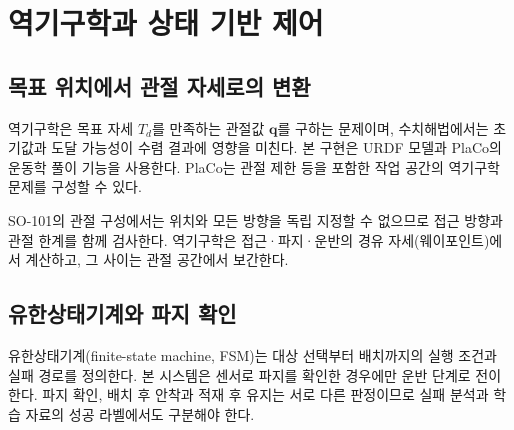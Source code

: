 \section{역기구학과 상태 기반 제어}
\subsection{목표 위치에서 관절 자세로의 변환}
역기구학은 목표 자세 $T_d$를 만족하는 관절값 $\boldsymbol{q}$를 구하는 문제이며, 수치해법에서는 초기값과 도달 가능성이 수렴 결과에 영향을 미친다\cite{modern-robotics}. 본 구현은 URDF 모델과 PlaCo의 운동학 풀이 기능을 사용한다. PlaCo는 관절 제한 등을 포함한 작업 공간의 역기구학 문제를 구성할 수 있다\cite{placo}.

SO-101의 관절 구성에서는 위치와 모든 방향을 독립 지정할 수 없으므로 접근 방향과 관절 한계를 함께 검사한다. 역기구학은 접근·파지·운반의 경유 자세(웨이포인트)에서 계산하고, 그 사이는 관절 공간에서 보간한다.

\subsection{유한상태기계와 파지 확인}
유한상태기계(finite-state machine, FSM)는 대상 선택부터 배치까지의 실행 조건과 실패 경로를 정의한다. 본 시스템은 센서로 파지를 확인한 경우에만 운반 단계로 전이한다. 파지 확인, 배치 후 안착과 적재 후 유지는 서로 다른 판정이므로 실패 분석과 학습 자료의 성공 라벨에서도 구분해야 한다.

\FloatBarrier
